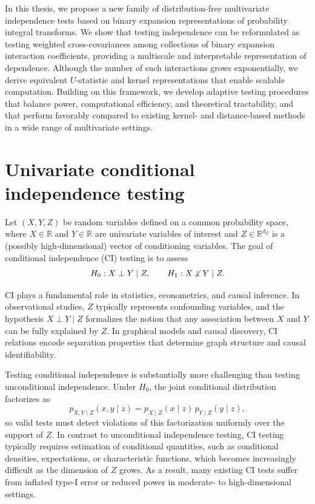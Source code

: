 \documentclass[12pt,reqno,oneside]{amsbook}
\theoremstyle{definition}
\theoremstyle{remark}
\begin{document}
In this thesis, we propose a new family of distribution-free multivariate
independence tests based on binary expansion representations of probability
integral transforms. We show that testing independence can be reformulated as
testing weighted cross-covariances among collections of binary expansion
interaction coefficients, providing a multiscale and interpretable
representation of dependence. Although the number of such interactions grows
exponentially, we derive equivalent $U$-statistic and kernel representations
that enable scalable computation. Building on this framework, we develop
adaptive testing procedures that balance power, computational efficiency, and
theoretical tractability, and that perform favorably compared to existing
kernel- and distance-based methods in a wide range of multivariate settings.


\section{Univariate conditional independence testing}
\label{subsec:ci_univariate_intro}

Let $(X,Y,Z)$ be random variables defined on a common probability space, where
$X\in\mathbb{R}$ and $Y\in\mathbb{R}$ are univariate variables of interest and
$Z\in\mathbb{R}^{d_Z}$ is a (possibly high-dimensional) vector of conditioning
variables. The goal of conditional independence (CI) testing is to assess
\[
H_0:X\perp Y\mid Z,
\qquad
H_1:X\not\!\perp Y\mid Z.
\]

CI plays a fundamental role in statistics, econometrics, and causal inference.
In observational studies, $Z$ typically represents confounding variables, and
the hypothesis $X \perp Y \mid Z$ formalizes the notion that any association
between $X$ and $Y$ can be fully explained by $Z$. In graphical models and causal
discovery, CI relations encode separation properties that determine graph
structure and causal identifiability.

Testing conditional independence is substantially more challenging than testing
unconditional independence. Under $H_0$, the joint conditional distribution
factorizes as
\[
p_{X,Y\mid Z}(x,y\mid z)
=
p_{X\mid Z}(x\mid z)\,p_{Y\mid Z}(y\mid z),
\]
so valid tests must detect violations of this factorization uniformly over the
support of $Z$. In contrast to unconditional independence testing, CI testing
typically requires estimation of conditional quantities, such as conditional
densities, expectations, or characteristic functions, which becomes increasingly
difficult as the dimension of $Z$ grows. As a result, many existing CI tests
suffer from inflated type-I error or reduced power in moderate- to
high-dimensional settings.
\end{document}
